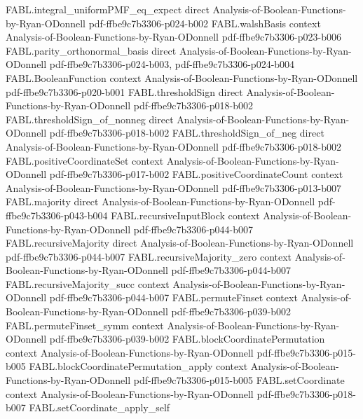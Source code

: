 \begin{theorem}
\proofstep
  {FABL.integral_uniformPMF_eq_expect}
  {direct}
  {Analysis-of-Boolean-Functions-by-Ryan-ODonnell}
  {pdf-ffbe9c7b3306-p024-b002}
\proofstep
  {FABL.walshBasis}
  {context}
  {Analysis-of-Boolean-Functions-by-Ryan-ODonnell}
  {pdf-ffbe9c7b3306-p023-b006}
\proofstep
  {FABL.parity_orthonormal_basis}
  {direct}
  {Analysis-of-Boolean-Functions-by-Ryan-ODonnell}
  {pdf-ffbe9c7b3306-p024-b003,
    pdf-ffbe9c7b3306-p024-b004}
\proofstep
  {FABL.BooleanFunction}
  {context}
  {Analysis-of-Boolean-Functions-by-Ryan-ODonnell}
  {pdf-ffbe9c7b3306-p020-b001}
\proofstep
  {FABL.thresholdSign}
  {direct}
  {Analysis-of-Boolean-Functions-by-Ryan-ODonnell}
  {pdf-ffbe9c7b3306-p018-b002}
\proofstep
  {FABL.thresholdSign_of_nonneg}
  {direct}
  {Analysis-of-Boolean-Functions-by-Ryan-ODonnell}
  {pdf-ffbe9c7b3306-p018-b002}
\proofstep
  {FABL.thresholdSign_of_neg}
  {direct}
  {Analysis-of-Boolean-Functions-by-Ryan-ODonnell}
  {pdf-ffbe9c7b3306-p018-b002}
\proofstep
  {FABL.positiveCoordinateSet}
  {context}
  {Analysis-of-Boolean-Functions-by-Ryan-ODonnell}
  {pdf-ffbe9c7b3306-p017-b002}
\proofstep
  {FABL.positiveCoordinateCount}
  {context}
  {Analysis-of-Boolean-Functions-by-Ryan-ODonnell}
  {pdf-ffbe9c7b3306-p013-b007}
\proofstep
  {FABL.majority}
  {direct}
  {Analysis-of-Boolean-Functions-by-Ryan-ODonnell}
  {pdf-ffbe9c7b3306-p043-b004}
\proofstep
  {FABL.recursiveInputBlock}
  {context}
  {Analysis-of-Boolean-Functions-by-Ryan-ODonnell}
  {pdf-ffbe9c7b3306-p044-b007}
\proofstep
  {FABL.recursiveMajority}
  {direct}
  {Analysis-of-Boolean-Functions-by-Ryan-ODonnell}
  {pdf-ffbe9c7b3306-p044-b007}
\proofstep
  {FABL.recursiveMajority_zero}
  {context}
  {Analysis-of-Boolean-Functions-by-Ryan-ODonnell}
  {pdf-ffbe9c7b3306-p044-b007}
\proofstep
  {FABL.recursiveMajority_succ}
  {context}
  {Analysis-of-Boolean-Functions-by-Ryan-ODonnell}
  {pdf-ffbe9c7b3306-p044-b007}
\proofstep
  {FABL.permuteFinset}
  {context}
  {Analysis-of-Boolean-Functions-by-Ryan-ODonnell}
  {pdf-ffbe9c7b3306-p039-b002}
\proofstep
  {FABL.permuteFinset_symm}
  {context}
  {Analysis-of-Boolean-Functions-by-Ryan-ODonnell}
  {pdf-ffbe9c7b3306-p039-b002}
\proofstep
  {FABL.blockCoordinatePermutation}
  {context}
  {Analysis-of-Boolean-Functions-by-Ryan-ODonnell}
  {pdf-ffbe9c7b3306-p015-b005}
\proofstep
  {FABL.blockCoordinatePermutation_apply}
  {context}
  {Analysis-of-Boolean-Functions-by-Ryan-ODonnell}
  {pdf-ffbe9c7b3306-p015-b005}
\proofstep
  {FABL.setCoordinate}
  {context}
  {Analysis-of-Boolean-Functions-by-Ryan-ODonnell}
  {pdf-ffbe9c7b3306-p018-b007}
\proofstep
  {FABL.setCoordinate_apply_self}

\end{theorem}
